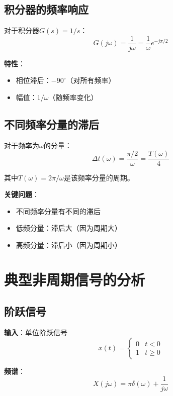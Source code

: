 \documentclass[12pt,a4paper]{article}
\begin{document}
\subsection{积分器的频率响应}

对于积分器$G(s) = 1/s$：
\begin{equation}
G(j\omega) = \frac{1}{j\omega} = \frac{1}{\omega} e^{-j\pi/2}
\end{equation}

\textbf{特性}：
\begin{itemize}
\item 相位滞后：$-90^\circ$（对所有频率）
\item 幅值：$1/\omega$（随频率变化）
\end{itemize}

\subsection{不同频率分量的滞后}

对于频率为$\omega$的分量：
\begin{equation}
\Delta t(\omega) = \frac{\pi/2}{\omega} = \frac{T(\omega)}{4}
\end{equation}

其中$T(\omega) = 2\pi/\omega$是该频率分量的周期。

\textbf{关键问题}：
\begin{itemize}
\item 不同频率分量有不同的滞后
\item 低频分量：滞后大（因为周期大）
\item 高频分量：滞后小（因为周期小）
\end{itemize}

\section{典型非周期信号的分析}

\subsection{阶跃信号}

\textbf{输入}：单位阶跃信号
\begin{equation}
x(t) = \begin{cases}
0 & t < 0 \\
1 & t \geq 0
\end{cases}
\end{equation}

\textbf{频谱}：
\begin{equation}
X(j\omega) = \pi \delta(\omega) + \frac{1}{j\omega}
\end{equation}
\end{document}
